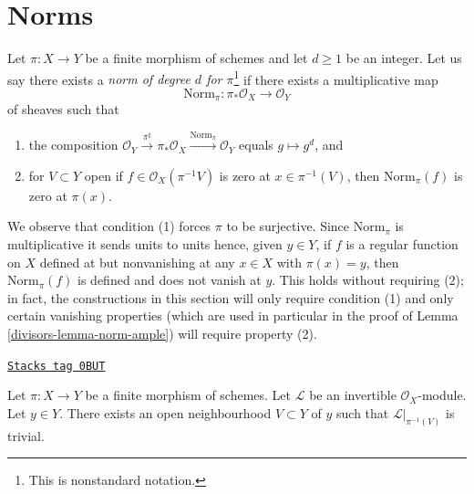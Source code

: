 \section{Norms}
\label{divisors-section-norms}
Let $\pi : X \to Y$ be a finite morphism of schemes and let $d \geq 1$
be an integer. Let us say there exists a
{\it norm of degree $d$ for $\pi$}\footnote{This is nonstandard
notation.} if there exists a multiplicative map
$$
\text{Norm}_\pi : \pi_*\mathcal{O}_X \to \mathcal{O}_Y
$$
of sheaves such that
\begin{enumerate}
\item the composition
$\mathcal{O}_Y \xrightarrow{\pi^\sharp} \pi_*\mathcal{O}_X
\xrightarrow{\text{Norm}_\pi} \mathcal{O}_Y$ equals $g \mapsto g^d$, and
\item for $V \subset Y$ open if $f \in \mathcal{O}_X(\pi^{-1}V)$
is zero at $x \in \pi^{-1}(V)$, then $\text{Norm}_\pi(f)$
is zero at $\pi(x)$.
\end{enumerate}
We observe that condition (1) forces $\pi$ to be surjective.
Since $\text{Norm}_\pi$ is multiplicative it sends units to units
hence, given $y \in Y$, if $f$ is a regular function on $X$
defined at but nonvanishing at any $x \in X$
with $\pi(x) = y$, then $\text{Norm}_\pi(f)$ is defined
and does not vanish at $y$. This holds without requiring (2);
in fact, the constructions in this section will only require condition (1)
and only certain vanishing properties (which are used in particular
in the proof of Lemma \ref{divisors-lemma-norm-ample}) will require property (2).

\begin{lemma}
\label{divisors-lemma-finite-trivialize-invertible-upstairs}
\href{https://stacks.math.columbia.edu/tag/0BUT}{\texttt{Stacks tag 0BUT}}

Let $\pi : X \to Y$ be a finite morphism of schemes.
Let $\mathcal{L}$ be an invertible $\mathcal{O}_X$-module.
Let $y \in Y$. There exists an open neighbourhood
$V \subset Y$ of $y$ such that $\mathcal{L}|_{\pi^{-1}(V)}$ is trivial.
\end{lemma}

